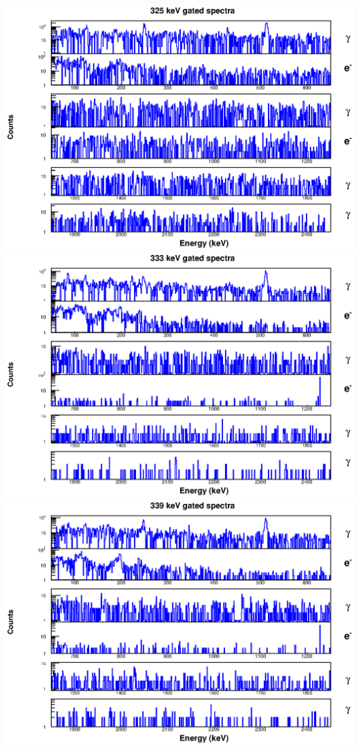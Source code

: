 \includegraphics[scale=0.8]{154Gd_Appendix/325_combined.eps}
\includegraphics[scale=0.8]{154Gd_Appendix/333_combined.eps}
\includegraphics[scale=0.8]{154Gd_Appendix/339_combined.eps}
